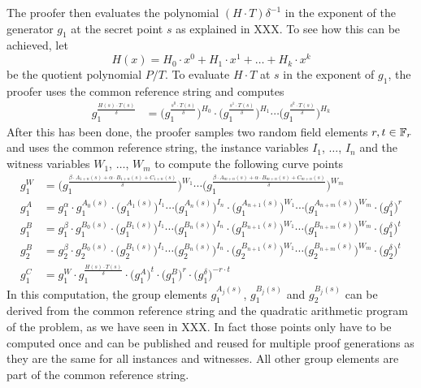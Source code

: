 The proofer then evaluates the polynomial $(H\cdot T)\delta^{-1}$ in the exponent of the generator $g_1$ at the secret point $s$ as explained in XXX. To see how this can be achieved, let
\begin{equation}
H(x) = H_0\cdot x^0 + H_1\cdot x^1 +\ldots + H_k \cdot x^k
\end{equation}
be the quotient polynomial $P/T$. To evaluate $H\cdot T$ at $s$ in the exponent of $g_1$, the proofer uses the common reference string and computes
\begin{align*}
g_1^{\frac{H(s)\cdot T(s)}{\delta}} 
 &= \Big(g_1^{\frac{s^0\cdot T(s)}{\delta}}\Big)^{H_0}\cdot \Big(g_1^{\frac{s^1\cdot T(s)}{\delta}}\Big)^{H_1}\cdots \Big(g_1^{\frac{s^k\cdot T(s)}{\delta}}\Big)^{H_k}
\end{align*}
After this has been done, the proofer samples two random field elements $r,t\in \mathbb{F}_r$ and uses the common reference string, the instance variables $I_1$, $\ldots$, $I_n$ and the witness variables $W_1$, $\ldots$, $W_m$ to compute the following curve points
\begin{align*}
g_1^W & = \Big( g_1^{\frac{\beta\cdot A_{1+n}(s)+\alpha\cdot B_{1+n}(s)+C_{1+n}(s)}{\delta}}\Big)^{W_1}\cdots \Big(g_1^{\frac{\beta\cdot A_{m+n}(s)+\alpha\cdot B_{m+n}(s)+C_{m+n}(s)}{\delta}}\Big)^{W_m}\\
g_1^A & = g_1^\alpha \cdot g_1^{A_0(s)} \cdot \Big(g_1^{A_1(s)}\Big)^{I_1}\cdots \Big(g_1^{A_n(s)}\Big)^{I_n} \cdot \Big(g_1^{A_{n+1}(s)}\Big)^{W_1}\cdots \Big(g_1^{A_{n+m}(s)}\Big)^{W_m} \cdot \Big(g_1^\delta\Big)^r \\
g_1^B & = g_1^\beta \cdot g_1^{B_0(s)} \cdot \Big(g_1^{B_1(s)}\Big)^{I_1}\cdots \Big(g_1^{B_n(s)}\Big)^{I_n} \cdot \Big(g_1^{B_{n+1}(s)}\Big)^{W_1}\cdots \Big(g_1^{B_{n+m}(s)}\Big)^{W_m} \cdot \Big(g_1^\delta\Big)^t\\
g_2^B & = g_2^\beta \cdot g_2^{B_0(s)} \cdot \Big(g_2^{B_1(s)}\Big)^{I_1}\cdots \Big(g_2^{B_n(s)}\Big)^{I_n} \cdot \Big(g_2^{B_{n+1}(s)}\Big)^{W_1}\cdots \Big(g_2^{B_{n+m}(s)}\Big)^{W_m} \cdot \Big(g_2^\delta\Big)^t \\
g_1^C & = g_1^W\cdot g_1^{\frac{H(s)\cdot T(s)}{\delta}} \cdot \Big(g_1^A\Big)^t \cdot \Big(g_1^B\Big)^r \cdot \Big(g_1^\delta\Big)^{-r\cdot t}
\end{align*}
In this computation, the group elements $g_1^{A_j(s)}$, $g_1^{B_j(s)}$ and $g_2^{B_j(s)}$ can be derived from the common reference string and the quadratic arithmetic program of the problem, as we have seen in XXX. In fact those points only have to be computed once and can be published and reused for multiple proof generations as they are the same for all instances and witnesses. All other group elements are part of the common reference string. 

